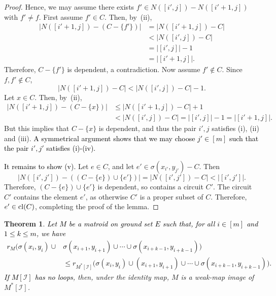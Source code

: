 \documentclass[11pt]{amsart}
\newtheorem{theorem}{Theorem}[section]
\newcommand{\cl}{{\rm cl}}
\newcommand{\blue}{\textcolor{black}}
\newcommand{\bloo}{\textcolor{black}}
\begin{document}
\begin{proof}
Hence, we may assume there exists $f' \in N([i',j])-N([i'+1,j])$ with $f' \neq f$. First assume $f' \in C$. Then, by~(ii),
\begin{align*}
|N([i'+1, j])-(C-\{f'\})| & = |N([i'+1, j])-C| \\
& < |N([i', j])-C| \\
& = \left|[i', j]\right|-1 \\
& = \left|[i'+1, j]\right|.
\end{align*}
Therefore, $C-\{f'\}$ is dependent, a contradiction. Now assume $f'\notin C$. Since $f, f'\not\in C$,
\[|N([i'+1, j])-C| < |N([i', j])-C|-1.\]
Let $x\in C$. Then, by~(ii),
\begin{align*}
|N([i'+1, j])-(C-\{x\})| & \leq |N([i'+1, j])-C|+1 \\
& < |N([i', j])-C| = \left|[i', j]\right|-1 = \left|[i'+1, j]\right|.
\end{align*}
But this implies that $C-\{x\}$ is dependent, and thus the pair $i',j$ satisfies (i), (ii) and (iii). \bloo{A symmetrical argument shows that we may choose $j' \in [m]$ such that the pair $i',j'$ satisfies (i)-(iv).}

\bloo{It remains to show (v).} Let $e \in C$, and let $e' \in \sigma(x_{i'},y_{j'})-C$. Then
\[
|N([i',j'])-((C-\{e\})\cup\{e'\})| = |N([i',j'])-C| < |[i',j']|.
\]
Therefore, $(C-\{e\})\cup\{e'\}$ is dependent, so contains a circuit $C'$. The circuit $C'$ contains the element $e'$, as otherwise $C'$ is a proper subset of $C$. Therefore, $e' \in \cl(C)$, completing the proof of the lemma.
\end{proof}

\begin{theorem}
\label{weak_map}
\blue{Let $M$ be a matroid on ground set $E$ such that, for all $i \in [m]$ and $1 \leq k \leq m$, we have
\begin{align*}
r_M\big(\sigma(x_i, y_i)\cup & \sigma(x_{i+1}, y_{i+1})\cup \cdots\cup \sigma(x_{i+k-1}, y_{i+k-1})\big) \\
& \leq r_{M^*[\mathscr I]}\big(\sigma(x_i, y_i)\cup (x_{i+1}, y_{i+1})\cup \cdots\cup \sigma(x_{i+k-1}, y_{i+k-1})\big).
\end{align*}
If $M[\mathscr I]$ has no \bloo{loops}}, then, under the identity map, $M$ is a weak-map image of $M^*[\mathscr I]$.
\end{theorem}
\end{document}
